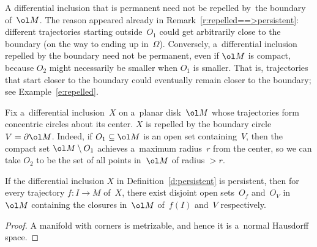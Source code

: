 \begin{Remark}
\label{r:permanent}
A dif\/ferential inclusion that is permanent need not be repelled by~the boundary of~$\ol M$.
The reason appeared already in Remark~\ref{r:repelled==>persistent}: dif\/ferent trajectories starting outside~$O_1$
could get arbitrarily close to the boundary (on the way to ending up in~$\Omega$).
Conversely, a~dif\/ferential inclusion repelled by the boundary need not be permanent, even if $\ol M$ is compact,
because $O_2$ might necessarily be smaller when $O_1$ is smaller.
That is, trajectories that start closer to the boundary could eventually remain closer to the boundary; see
Example~\ref{e:repelled}.
\end{Remark}
\begin{Example}
\label{e:repelled}
Fix a~dif\/ferential inclusion~$X$ on a~planar disk~$\ol M$ whose trajectories form concentric circles about its center.
$X$ is repelled by the boundary circle $V=\partial\ol M$.
Indeed, if $O_1\subseteq\ol M$ is an open set containing~$V$, then the compact set $\ol M\setminus O_1$ achieves
a~maximum radius~$r$ from the center, so we can take $O_2$ to be the set of all points in~$\ol M$ of radius $>r$.
\end{Example}
\begin{Lemma}
\label{l:normal}
If the differential inclusion $X$ in Definition~{\rm \ref{d:persistent}} is persistent, then for every trajec\-tory $f:I\to
M$ of~$X$, there exist disjoint open sets~$O_f$ and~$O_V$ in~$\ol M$ containing the closures in~$\ol M$ of~$f(I)$
and~$V$ respectively.
\end{Lemma}

\begin{proof}
A manifold with corners is metrizable, and hence it is a~normal Hausdorf\/f space.
\end{proof}

